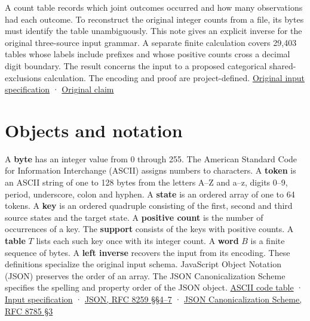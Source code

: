 \documentclass[11pt,a4paper]{article}
\title{\PidReportTitle{When does a three-source count table have unique bytes?}{Canonical finite input for categorical shared exclusions}}
\author{Sepehr Mahmoudian}
\date{2026}
\begin{document}
\PidMakeTitle
\fontsize{10.5}{12.8}\selectfont
A count table records which joint outcomes occurred and how many observations had each outcome. To reconstruct the original integer counts from a file, its bytes must identify the table unambiguously. This note gives an explicit inverse for the original three-source input grammar. A separate finite calculation covers 29,403 tables whose labels include prefixes and whose positive counts cross a decimal digit boundary. The result concerns the input to a proposed categorical shared-exclusions calculation. The encoding and proof are project-defined. \href{https://github.com/sepahead/pid-rs/blob/1479fc5e0ca15e5ef9c5521f8bc7aa36f2a98d20/claims/SX-CERTIFIED-AVERAGED-PID3-001/bindings.md}{Original input specification} · \href{https://github.com/sepahead/pid-rs/blob/1479fc5e0ca15e5ef9c5521f8bc7aa36f2a98d20/claims/SX-CERTIFIED-AVERAGED-PID3-001/claim-v1.md}{Original claim}

\section{Objects and notation}\label{objects-and-notation}

A \textbf{byte} has an integer value from 0 through 255. The American Standard Code for Information Interchange (ASCII) assigns numbers to characters. A \textbf{token} is an ASCII string of one to 128 bytes from the letters A--Z and a--z, digits 0--9, period, underscore, colon and hyphen. A \textbf{state} is an ordered array of one to 64 tokens. A \textbf{key} is an ordered quadruple consisting of the first, second and third source states and the target state. A \textbf{positive count} is the number of occurrences of a key. The \textbf{support} consists of the keys with positive counts. A \textbf{table} \(T\) lists each such key once with its integer count. A \textbf{word} \(B\) is a finite sequence of bytes. A \textbf{left inverse} recovers the input from its encoding. These definitions specialize the original input schema. JavaScript Object Notation (JSON) preserves the order of an array. The JSON Canonicalization Scheme specifies the spelling and property order of the JSON object. \href{https://datatracker.ietf.org/doc/html/rfc20\#section-2}{ASCII code table} · \href{https://github.com/sepahead/pid-rs/blob/1479fc5e0ca15e5ef9c5521f8bc7aa36f2a98d20/claims/SX-CERTIFIED-AVERAGED-PID3-001/bindings.md}{Input specification} · \href{https://datatracker.ietf.org/doc/html/rfc8259\#section-4}{JSON, RFC 8259 §§4--7} · \href{https://datatracker.ietf.org/doc/html/rfc8785\#section-3}{JSON Canonicalization Scheme, RFC 8785 §3}
\end{document}
